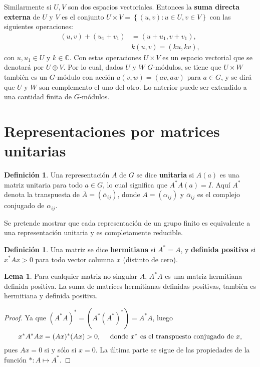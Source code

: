 \documentclass[12pt]{book}
\theoremstyle{definition}
\newtheorem{definition}[theorem]{Definición}
\newtheorem{lemma}[theorem]{Lema}
\newcounter{in}
\newcounter{ini}
\begin{document}
\begin{mdframed}
  Similarmente si $U,V$ son dos espacios vectoriales. Entonces la
  \textbf{suma directa externa} de $U$ y $V$ es el conjunto
  $U \times V = \left \{ (u,v) \colon u \in U, v \in V \right \}$ con
  las siguientes operaciones:
  \begin{equation}
    \label{eq:94}
    \begin{split}
(u,v)+(u_1+v_1) & = (u+u_1,v+v_1), \\
 & k(u,v) = (ku,kv),
\end{split}
  \end{equation}
  con $u, u_1 \in U$ y $k \in \mathbb{C}$. Con estas operaciones
  $U \times V$ es un espacio vectorial que se denotará por
  $U \oplus V$.  Por lo cual, dados $U$ y $W$ $G$-módulos, se tiene
  que $U \times W$ también es un $G$-módulo con acción
  $a(v,w) = (av,aw)$ para $a \in G$, y se dirá que $U$ y $W$ son complemento el uno del otro. Lo anterior puede ser extendido a
  una cantidad finita de $G$-módulos.
\end{mdframed}
\section{Representaciones por matrices unitarias}
\label{sec:munitarias}
\begin{definition}
Una representación $A$ de $G$ se dice \textbf{unitaria} si $A\left(a\right)$ es
una matriz unitaria para todo $a \in G$, lo cual significa que
$A^{*}A\left(a\right)=I$. Aquí $A^{*}$ denota la transpuesta de
$\overline{A}=\left(\overline{\alpha}_{ij}\right)$, donde
$A=\left(\alpha_{ij}\right)$ y $\overline{\alpha}_{ij}$
es el complejo conjugado de $\alpha_{ij}$. 
\end{definition}
Se pretende mostrar que cada representación de un grupo finito es equivalente a
una representación unitaria y es completamente reducible.
\begin{definition}
Una matriz se dice \textbf{hermitiana} si $A^{*}=A$, y \textbf{definida positiva} si
$x^{*}Ax>0$ para todo vector columna $x$ (distinto de cero).
\end{definition}
\begin{lemma}
  \label{l2_1}
  Para cualquier matriz no singular $A$, $A^{*}A$ es una matriz
  hermitiana definida positiva. La suma de matrices hermitianas
  definidas positivas, también es hermitiana y definida positiva.
  \begin{proof}
    Ya que $(A^{*}A)^{*} = (A^{*}(A^{*})^{*}) = A^{*}A$, 
    luego
    \begin{equation*}
   x^{*}A^{*}Ax = (Ax)^{*}(Ax)>0, \quad \textup{ donde }x^{*} \textup{ es el transpuesto conjugado de } x,
  \end{equation*}
    pues $Ax = 0$ si y sólo si
    $x = 0$. La última parte se sigue de las propiedades de la función
    $* \colon A \mapsto A^{*}$.
  \end{proof}  

\end{lemma}
\end{document}
